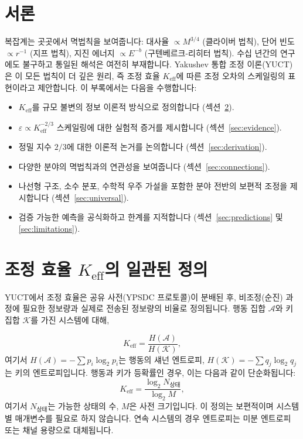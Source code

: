 \documentclass[11pt,a4paper]{article}
\newcommand{\Keff}{K_{\mathrm{eff}}}
\newcommand{\eps}{\varepsilon}
\begin{document}
	\tableofcontents
	\newpage
	
	\section{서론}
	\label{sec:intro}
	
	복잡계는 곳곳에서 멱법칙을 보여줍니다: 대사율 \(\propto M^{3/4}\) (클라이버 법칙), 단어 빈도 \(\propto r^{-1}\) (지프 법칙), 지진 에너지 \(\propto E^{-b}\) (구텐베르크-리히터 법칙). 수십 년간의 연구에도 불구하고 통일된 해석은 여전히 부재합니다. Yakushev 통합 조정 이론(YUCT)은 이 모든 법칙이 더 깊은 원리, 즉 조정 효율 \(\Keff\)에 따른 조정 오차의 스케일링의 표현이라고 제안합니다. 이 부록에서는 다음을 수행합니다:
	\begin{itemize}
		\item \(\Keff\)를 규모 불변의 정보 이론적 방식으로 정의합니다 (섹션~\ref{sec:keff}).
		\item \(\eps \propto \Keff^{-2/3}\) 스케일링에 대한 실험적 증거를 제시합니다 (섹션~\ref{sec:evidence}).
		\item 정밀 지수 \(2/3\)에 대한 이론적 논거를 논의합니다 (섹션~\ref{sec:derivation}).
		\item 다양한 분야의 멱법칙과의 연관성을 보여줍니다 (섹션~\ref{sec:connections}).
		\item 나선형 구조, 소수 분포, 수학적 우주 가설을 포함한 분야 전반의 보편적 조정을 제시합니다 (섹션~\ref{sec:universal}).
		\item 검증 가능한 예측을 공식화하고 한계를 지적합니다 (섹션~\ref{sec:predictions} 및 \ref{sec:limitations}).
	\end{itemize}
	
	\section{조정 효율 \(\Keff\)의 일관된 정의}
	\label{sec:keff}
	
	YUCT에서 조정 효율은 공유 사전(YPSDC 프로토콜)이 분배된 후, 비조정(순진) 과정에 필요한 정보량과 실제로 전송된 정보량의 비율로 정의됩니다. 행동 집합 \(\mathcal{A}\)와 키 집합 \(\mathcal{K}\)를 가진 시스템에 대해,
	
	\begin{equation}
		\Keff = \frac{H(\mathcal{A})}{H(\mathcal{K})},
		\label{eq:keff}
	\end{equation}
	여기서 \(H(\mathcal{A}) = -\sum p_i \log_2 p_i\)는 행동의 섀넌 엔트로피, \(H(\mathcal{K}) = -\sum q_j \log_2 q_j\)는 키의 엔트로피입니다. 행동과 키가 등확률인 경우, 이는 다음과 같이 단순화됩니다:
	\begin{equation}
		\Keff = \frac{\log_2 N_{\text{상태}}}{\log_2 M},
		\label{eq:keff-simple}
	\end{equation}
	여기서 \(N_{\text{상태}}\)는 가능한 상태의 수, \(M\)은 사전 크기입니다. 이 정의는 보편적이며 시스템별 매개변수를 필요로 하지 않습니다. 연속 시스템의 경우 엔트로피는 미분 엔트로피 또는 채널 용량으로 대체됩니다.
	
\end{document}
